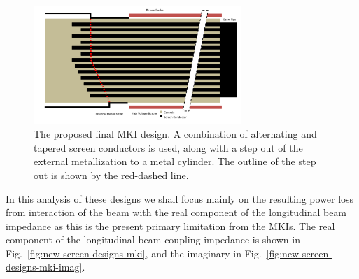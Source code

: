\begin{figure}
\begin{center}
\includegraphics[width=0.7\textwidth]{LHC_MKI/figures/mki-design-layouts/mki-final-design.pdf}
\end{center}
\caption{The proposed final MKI design. A combination of alternating and tapered screen conductors is used, along with a step out of the external metallization to a metal cylinder. The outline of the step out is shown by the red-dashed line.}
\label{fig:24-final-design}
\end{figure}

In this analysis of these designs we shall focus mainly on the resulting power loss from interaction of the beam with the real component of the longitudinal beam impedance as this is the present primary limitation from the MKIs. The real component of the longitudinal beam coupling impedance is shown in Fig.~\ref{fig:new-screen-designs-mki}, and the imaginary in Fig.~\ref{fig:new-screen-designs-mki-imag}.


